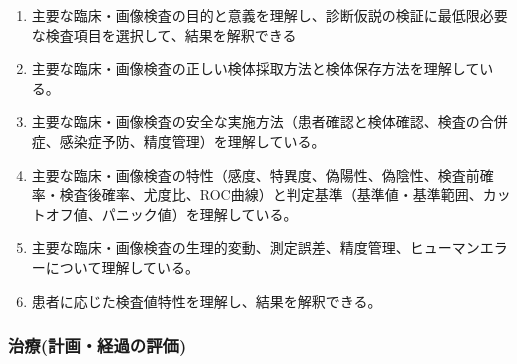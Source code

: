 \documentclass[
]{ltjsarticle}
\providecommand{\tightlist}{%
  \setlength{\itemsep}{0pt}\setlength{\parskip}{0pt}}
\begin{document}
\begin{enumerate}
\def\labelenumi{\arabic{enumi}.}
\tightlist
\item
  主要な臨床・画像検査の目的と意義を理解し、診断仮説の検証に最低限必要な検査項目を選択して、結果を解釈できる
\item
  主要な臨床・画像検査の正しい検体採取方法と検体保存方法を理解している。
\item
  主要な臨床・画像検査の安全な実施方法（患者確認と検体確認、検査の合併症、感染症予防、精度管理）を理解している。
\item
  主要な臨床・画像検査の特性（感度、特異度、偽陽性、偽陰性、検査前確率・検査後確率、尤度比、ROC曲線）と判定基準（基準値・基準範囲、カットオフ値、パニック値）を理解している。
\item
  主要な臨床・画像検査の生理的変動、測定誤差、精度管理、ヒューマンエラーについて理解している。
\item
  患者に応じた検査値特性を理解し、結果を解釈できる。
\end{enumerate}

\hypertarget{ux6cbbux7642ux8a08ux753bux7d4cux904eux306eux8a55ux4fa1}{%
\subsubsection{治療(計画・経過の評価)}\label{ux6cbbux7642ux8a08ux753bux7d4cux904eux306eux8a55ux4fa1}}
\end{document}
